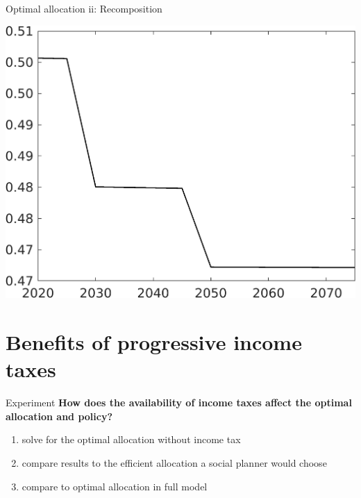 \documentclass[11pt,aspectratio=169]{beamer}
\newcommand{\ar}{$\Rightarrow$ \ }
\begin{document}
\begin{frame}{Optimal allocation ii: Recomposition}
\begin{minipage}[]{0.32\textwidth}
	\end{minipage}
\begin{minipage}[]{0.32\textwidth}
	\includegraphics[width=1\textwidth]{../codding_model/own_basedOnFried/optimalPol_elastS_DisuSci/figures/all_1705/Single_OPT_T_NoTaus_EY_spillover0_sep1_BN1_ineq0_red0_etaa0.79.png}
\end{minipage}
\end{frame}

\section*{Benefits of progressive income taxes}
\begin{frame}{Experiment}
\hspace{-6mm}	\alert{\textbf{How does the availability of income taxes affect the optimal allocation and policy?}}

	\begin{enumerate}
		\item<2-> solve for the optimal allocation  without income tax
		\vspace{2mm}
		\item<3-> compare results to the efficient allocation a social planner would choose						\vspace{2mm}
		\item<4-> compare to optimal allocation in full model 
		\vspace{2mm}
	\end{enumerate}
\end{frame}
\end{document}
